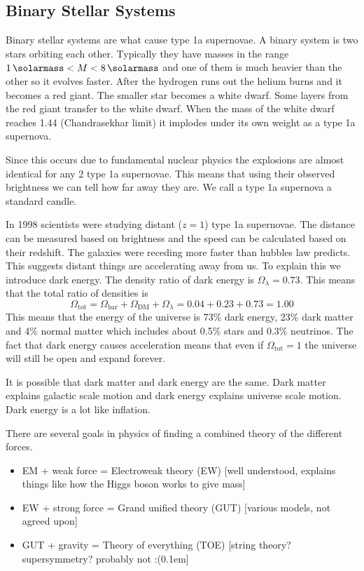 \subsection*{Binary Stellar Systems}

Binary stellar systems are what cause type 1a supernovae. A binary system is two stars orbiting each other. Typically they have masses in the range \(\SI{1}{\solarmass}<M<\SI{8}{\solarmass}\) and one of them is much heavier than the other so it evolves faster. After the hydrogen runs out the helium burns and it becomes a red giant. The smaller star becomes a white dwarf. Some layers from the red giant transfer to the white dwarf. When the mass of the white dwarf reaches \SI{1.44}{\solarmass} (Chandrasekhar limit) it implodes under its own weight as a type 1a supernova.

Since this occurs due to fundamental nuclear physics the explosions are almost identical for any 2 type 1a supernovae. This means that using their observed brightness we can tell how far away they are. We call a type 1a supernova a standard candle.

In 1998 scientists were studying distant (\(z=1\)) type 1a supernovae. The distance can be measured based on brightness and the speed can be calculated based on their redshift. The galaxies were receding more faster than hubbles law predicts. This suggests distant things are accelerating away from us. To explain this we introduce dark energy. The density ratio of dark energy is \(\Omega_\lambda=0.73\). This means that the total ratio of densities is
\[\Omega_\mathrm{tot}=\Omega_\mathrm{bar}+\Omega_\mathrm{DM}+\Omega_\lambda=0.04+0.23+0.73=1.00\]
This means that the energy of the universe is 73\% dark energy, 23\% dark matter and 4\% normal matter which includes about 0.5\% stars and 0.3\% neutrinos. The fact that dark energy causes acceleration means that even if \(\Omega_\mathrm{tot}=1\) the universe will still be open and expand forever.

It is possible that dark matter and dark energy are the same. Dark matter explains galactic scale motion and dark energy explains universe scale motion. Dark energy is a lot like inflation.

There are several goals in physics of finding a combined theory of the different forces.
\begin{itemize}
\item EM + weak force = Electroweak theory (EW) [well understood, explains things like how the Higgs boson works to give mass]
\item EW + strong force = Grand unified theory (GUT) [various models, not agreed upon]
\item GUT + gravity = Theory of everything (TOE) [string theory? supersymmetry? probably not :(\kern0.1em]
\end{itemize}
%
